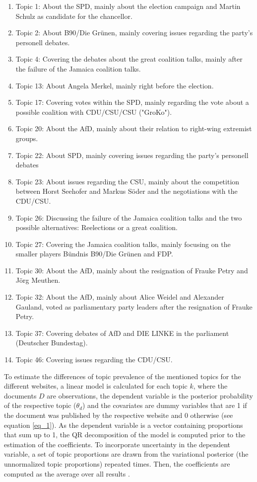 \documentclass[12pt,a4paper,notitlepage]{article}
\begin{document}
\begin{enumerate}
	\item Topic 1: About the SPD, mainly about the election campaign and Martin Schulz as candidate for the chancellor.	
	\item Topic 2: About B90/Die Grünen, mainly covering issues regarding the party's personell debates.
	\item Topic 4: Covering the debates about the great coalition talks, mainly after the failure of the Jamaica coalition talks.
	\item Topic 13: About Angela Merkel, mainly right before the election. 
	\item Topic 17: Covering votes within the SPD, mainly regarding the vote about a possible coalition with CDU/CSU/CSU ("GroKo").	
	\item Topic 20: About the AfD, mainly about their relation to right-wing extremist groups.
	\item Topic 22: About SPD, mainly covering issues regarding the party's personell debates
	\item Topic 23: About issues regarding the CSU, mainly about the competition between Horst Seehofer and Markus Söder and the negotiations with the CDU/CSU.
	\item Topic 26: Discussing the failure of the Jamaica coalition talks and the two possible alternatives: Reelections or a great coalition.
	\item Topic 27: Covering the Jamaica coalition talks, mainly focusing on the smaller players Bündnis B90/Die Grünen and FDP.	
	\item Topic 30: About the AfD, mainly about the resignation of Frauke Petry and Jörg Meuthen.
	\item Topic 32: About the AfD, mainly about Alice Weidel and Alexander Gauland, voted as parliamentary party leaders after the resignation of Frauke Petry.
	\item Topic 37: Covering debates of AfD and DIE LINKE in the parliament (Deutscher Bundestag).
	\item Topic 46: Covering issues regarding the CDU/CSU.
\end{enumerate}   

To estimate the differences of topic prevalence of the mentioned topics for the different websites, a linear model is calculated for each topic $k$, where the documents $D$ are observations, the dependent variable is the posterior probability of the respective topic ($\theta_{d}$) and the covariates are dummy variables that are 1 if the document was published by the respective website and 0 otherwise (see equation \ref{eq_1}). As the dependent variable is a vector containing proportions that sum up to 1, the QR decomposition of the model is computed prior to the estimation of the coefficients. To incorporate uncertainty in the dependent variable, a set of topic proportions are drawn from the variational posterior (the unnormalized topic proportions) repeated times. Then, the coefficients are computed as the average over all results \citep{roberts_model_2016}.
\end{document}
